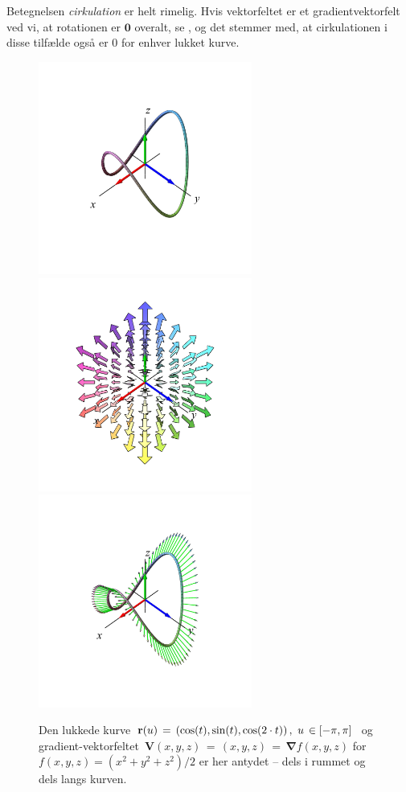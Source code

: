 \begin{think}
Betegnelsen \emph{cirkulation} er helt rimelig. Hvis vektorfeltet er et gradientvektorfelt ved vi, at rotationen er $\mathbf{0}$ overalt, se , og det stemmer med, at cirkulationen i disse tilfælde også er $0$ for enhver lukket kurve.
\end{think}




\begin{figure}[t]
\centerline{\includegraphics[height=70mm]{FIGS/plotTangKurveLuk1}\includegraphics[height=70mm]{FIGS/plotTangKurveLuk2}\includegraphics[height=70mm]{FIGS/plotTangKurveLuk3}}
\begin{center}
\caption{\small{Den lukkede kurve ${\bf r}(u) \, = \,
\left( \cos(t), \sin(t), \cos(2\cdot t) \right),
\, \, u \, \in [-\pi, \pi]\, $ og gradient-vektorfeltet
$\, {\mathbf{V}}(x,y,z) \, = \, (x, y,z)\,  = \, \bm{\nabla}f(x,y,z)$ for $f(x,y,z)= (x^{2} + y^{2} + z^{2})/2$
er her antydet -- dels i rummet og dels langs kurven. }} \label{figKurveLuk}
\end{center}
\end{figure}

